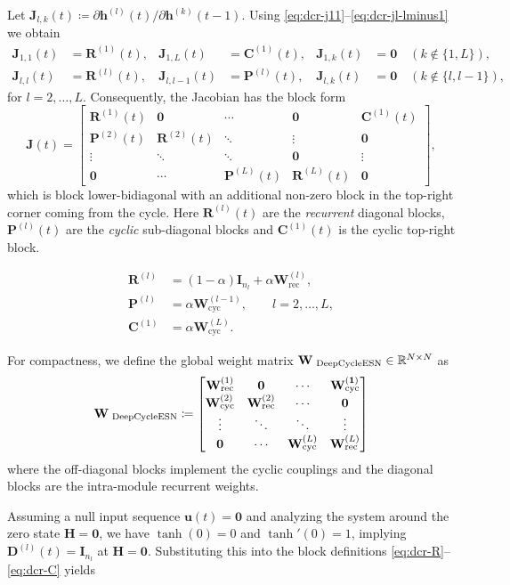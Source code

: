 Let $\mathbf{J}_{l,k}(t)\coloneqq \partial \mathbf{h}^{(l)}(t)/\partial \mathbf{h}^{(k)}(t-1)$. Using \eqref{eq:dcr-j11}--\eqref{eq:dcr-jl-lminus1} we obtain
\begin{align}
\mathbf{J}_{1,1}(t) &= \mathbf{R}^{(1)}(t), &
\mathbf{J}_{1,L}(t) &= \mathbf{C}^{(1)}(t), &
\mathbf{J}_{1,k}(t) &= \mathbf{0}\quad (k\notin\{1,L\}), \label{eq:dcr-J-row1}\\
\mathbf{J}_{l,l}(t) &= \mathbf{R}^{(l)}(t), &
\mathbf{J}_{l,l-1}(t) &= \mathbf{P}^{(l)}(t), &
\mathbf{J}_{l,k}(t) &= \mathbf{0}\quad (k\notin\{l,l-1\}), \label{eq:dcr-J-lower}
\end{align}
for $l=2,\dots,L$. Consequently, the Jacobian has the block form
\[
\mathbf{J}(t) =
\begin{bmatrix}
\mathbf{R}^{(1)}(t) & \mathbf{0} & \cdots & \mathbf{0} & \mathbf{C}^{(1)}(t) \\
\mathbf{P}^{(2)}(t) & \mathbf{R}^{(2)}(t) & \ddots & \vdots & \mathbf{0} \\
\vdots & \ddots & \ddots & \mathbf{0} & \vdots \\
\mathbf{0} & \cdots & \mathbf{P}^{(L)}(t) & \mathbf{R}^{(L)}(t) & \mathbf{0}
\end{bmatrix},
\]
which is block lower-bidiagonal with an additional non-zero block in the top-right corner coming from the cycle.
Here $\mathbf{R}^{(l)}(t)$ are the \textit{recurrent} diagonal blocks, $\mathbf{P}^{(l)}(t)$ are the \textit{cyclic} sub-diagonal blocks and
$\mathbf{C}^{(1)}(t)$ is the cyclic top-right block.

\begin{align}
\mathbf{R}^{(l)} &= (1-\alpha)\mathbf{I}_{n_l} + \alpha \mathbf{W}_{\text{rec}}^{(l)},\\
\mathbf{P}^{(l)} &= \alpha \mathbf{W}_{\text{cyc}}^{(l-1)},\qquad l=2,\dots,L,\\
\mathbf{C}^{(1)} &= \alpha \mathbf{W}_{\text{cyc}}^{(L)}.
\end{align}

For compactness, we define the global   \DCR\@ weight matrix $\mathbf{W}_{\text{ DeepCycleESN}}\in\mathbb{R}^{N\times N}$ as
\begin{equation}
\mathbf{W}_{\text{ DeepCycleESN}} \coloneqq \begin{bmatrix} \mathbf{W}_{\text{rec}}^{(1)} & \mathbf{0} & \cdots & \mathbf{\mathbf{W}_{\text{cyc}}^{(1)}} \\ \mathbf{W}_{\text{cyc}}^{(2)} & \mathbf{W}_{\text{rec}}^{(2)} & \cdots & \mathbf{0} \\ \vdots & \ddots & \ddots & \vdots \\ \mathbf{0} & \cdots & \mathbf{W}_{\text{cyc}}^{(L )} & \mathbf{W}_{\text{rec}}^{(L)} \end{bmatrix}
\label{eq:dcr-WDCR}
\end{equation}
where the off-diagonal blocks implement the cyclic couplings and the diagonal blocks are the intra-module recurrent weights.

Assuming a null input sequence $\mathbf{u}(t) = \mathbf{0}$ and analyzing the system around the zero state $\mathbf{H} = \mathbf{0}$, we have $\tanh(0)=0$ and $\tanh'(0)=1$, implying $\mathbf{D}^{(l)}(t) = \mathbf{I}_{n_l}$ at $\mathbf{H}=\mathbf{0}$.
Substituting this into the block definitions \eqref{eq:dcr-R}--\eqref{eq:dcr-C} yields


